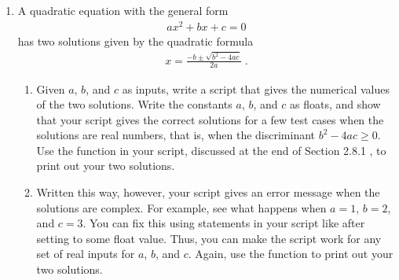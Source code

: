 \documentclass[letterpaper,10pt,english]{sphinxmanual}
\begin{document}
\begin{enumerate}
\item {} 
\sphinxAtStartPar
A quadratic equation with the general form
\begin{equation*}
\begin{split}ax^2+bx+c=0\end{split}
\end{equation*}
\sphinxAtStartPar
has two solutions given by the quadratic formula
\begin{equation*}
\begin{split}x = \frac{-b \pm \sqrt{b^2-4ac}}{2a} \;.\end{split}
\end{equation*}\begin{enumerate}
%
\item {} 
\sphinxAtStartPar
Given \(a\), \(b\), and \(c\) as inputs, write a script that gives the numerical values of the two solutions.  Write the constants \(a\), \(b\), and \(c\) as floats, and show that your script gives the correct solutions for a few test cases when the solutions are real numbers, that is, when the discriminant \(b^2-4ac \ge 0\).  Use the  function in your script, discussed at the end of Section 2.8.1 {\hyperref[\detokenize{chap2/chap2_basics:chap2-scriptexmp1}]{}}, to print out your two solutions.

\item {} 
\sphinxAtStartPar
Written this way, however, your script gives an error message when the solutions are complex.  For example, see what happens when \(a=1\), \(b=2\), and \(c=3\).  You can fix this using statements in your script like  after setting  to some float value.  Thus, you can make the script work for any set of real inputs for \(a\), \(b\), and \(c\).  Again, use the  function to print out your two solutions.

\end{enumerate}

\end{enumerate}

\sphinxstepscope
\end{document}
